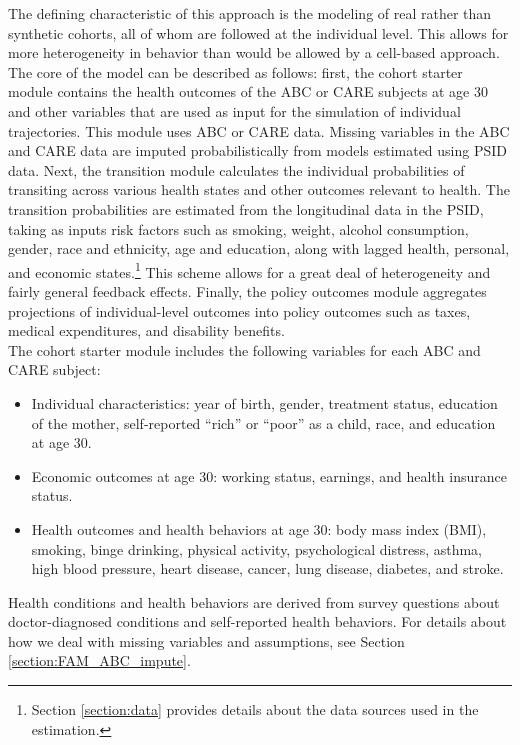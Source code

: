 \noindent The defining characteristic of this approach is the modeling of real rather than synthetic cohorts, all of whom
are followed at the individual level. This allows for more heterogeneity in behavior than would be allowed
by a cell-based approach. The core of the model can be described as follows: first, the cohort starter module contains the health outcomes of the ABC or CARE subjects at age 30 and other variables that are used as input for the simulation of individual trajectories. This module uses ABC or CARE data. Missing variables in the ABC and CARE data are imputed probabilistically from models estimated using PSID data.  Next, the transition module calculates the individual probabilities of transiting across various health states and other outcomes relevant to health. The transition probabilities are estimated from the longitudinal data in the PSID, taking as inputs risk factors such as smoking, weight, alcohol consumption, gender, race and ethnicity, age and education, along with lagged health, personal, and economic states.\footnote{Section \ref{section:data} provides details about the data sources used in the estimation.} This scheme allows for a great deal of heterogeneity and fairly general feedback effects. Finally, the policy outcomes module aggregates projections of individual-level outcomes into policy outcomes such as
taxes, medical expenditures, and disability benefits. \\


\noindent The cohort starter module includes the following variables for each ABC and CARE subject: \\
\begin{itemize}
\item Individual characteristics: year of birth, gender, treatment status, education of the mother, self-reported ``rich'' or ``poor'' as a child, race, and education at age 30.
\item Economic outcomes at age 30: working status, earnings, and health insurance status.
\item Health outcomes and health behaviors at age 30: body mass index (BMI), smoking, binge drinking, physical activity, psychological distress, asthma, high blood pressure, heart disease, cancer, lung disease, diabetes, and stroke.
\end{itemize}
\noindent Health conditions and health behaviors are derived from survey questions about doctor-diagnosed conditions and self-reported health behaviors. For details about how we deal with missing variables and assumptions, see Section \ref{section:FAM_ABC_impute}. %
 \\

